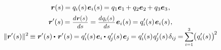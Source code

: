 \nopagebreak\vspace{-0.2em}\begin{gather*}
%
\locationvector(s) \hspace{-0.2ex} = q_{i}(s) \hspace{.2ex} \bm{e}_{i}(s) \hspace{-0.2ex} = q_1 \bm{e}_1 \hspace{-0.2ex} + q_2 \bm{e}_2 \hspace{-0.2ex} + q_3 \bm{e}_3
\hspace{.1ex} ,
\\[.1em]
%
\locationvector'(s) \hspace{-0.2ex}
= \scalebox{.88}{$ \displaystyle\frac{\raisemath{-0.2em}{d \hspace{.1ex} \locationvector(s)}}{ds} $}
= \scalebox{.88}{$ \displaystyle\frac{\raisemath{-0.2em}{d \hspace{.1ex} q_{i}(s)}}{ds} $} \hspace{.2ex} \bm{e}_{i}(s) \hspace{-0.2ex}
= q_{i}'(s) \hspace{.2ex} \bm{e}_{i}(s)
\hspace{.1ex} ,
\\[-0.5em]
%
\| \locationvector'(s) \|^{2} \hspace{-0.2ex} \equiv \locationvector'(s) \hspace{-0.1ex} \dotp \hspace{.2ex} \locationvector'(s) \hspace{-0.2ex}
= q_{i}'(s) \hspace{.2ex} \bm{e}_{i} \hspace{-0.1ex} \dotp \hspace{.1ex} q_{\hspace{-0.1ex}j}'(s) \hspace{.2ex} \bm{e}_{\hspace{-0.1ex}j} \hspace{-0.2ex}
= q_{i}'(s) \hspace{.2ex} q_{\hspace{-0.1ex}j}'(s) \hspace{.2ex} \delta_{i\hspace{-0.1ex}j} \hspace{-0.2ex}
= \hspace{-0.2ex} \scalebox{.88}{$ \displaystyle\sum_{i=1}^{3} $} \hspace{-0.1ex} \bigl( \hspace{.1ex} q_{i}'(s) \hspace{.1ex} \bigr)^{\hspace{-0.2ex}2}

\end{gather*}
